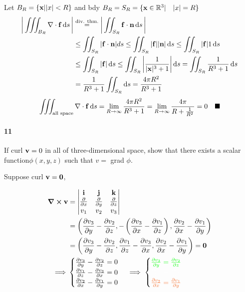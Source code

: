 \documentclass{article}
\newcommand\R{\mathbb{R}}
\begin{document}
Let $B_R = \{\vb{x}| |x| < R\}$ and bdy $B_R = S_R =\{\vb{x}\in \R^3
|\quad |x|=R\} $
\begin{align*}
  \bigg|\iiint_{B_R} \nabla\cdot \bold{f} \dd{s}\bigg|
  &\overset{\text{div. thm.}}{=}
    \bigg|\iint_{S_R} \bold{f}
    \cdot \vb{n} \dd{s}
    \bigg| \\
  &\leq \iint_{S_R} |\bold{f}
    \cdot \vb{n}|
  ds \leq \iint_{S_R} |\bold{f}|
    |\vb{n}| \dd{s} \leq \iint_{S_R} |\bold{f}|
    1 \dd{s}\\
  &\leq \iint_{S_R} |\bold{f}| \dd{s} \leq \iint_{S_R} \bigg|\frac{1}{|\bold{x}|^3+1}\bigg| \dd{s}
    = \iint_{S_R} \frac{1}{R^3+1} \dd{s}\\
  &= \frac{1}{R^3+1}\iint_{S_R} \dd{s} =\frac{4\pi R^2}{ R^3 +1 }\\
\end{align*}
\[\iiint_{\text{all space}} \nabla\cdot \bold{f} \dd{s} =
  \lim_{R\rightarrow \infty} \frac{4\pi R^2}{ R^3 +1 } =
  \lim_{R\rightarrow \infty} \frac{4\pi}{ R +\frac{1}{R^2}} = 0\quad \blacksquare\]
\paragraph{11} If curl $\bold{v} = 0$ in all of three-dimensional space, show that there exists a
scalar function$ \phi(x, y, z)$ such that $v =$ grad $\phi$.

Suppose curl $\vb{v} = \vb{0}$,

\begin{align*}
  \curl{\vb{v}}
  &= \begin{vmatrix} \vb{i} &\vb{j} &\vb{k}\\
    \pdv{}{x} &\pdv{}{y} &\pdv{}{z}\\
    v_1 &v_2 &v_3\end{vmatrix}\\
  &= \left(\pdv{v_3}{y} -\pdv{v_2}{z}, -\left( \pdv{v_3}{x}-
    \pdv{v_1}{z} \right), \pdv{v_2}{x} -\pdv{v_1}{y} \right)\\
  &= \left(\pdv{v_3}{y} -\pdv{v_2}{z},
    \pdv{v_1}{z} -\pdv{v_3}{x}, \pdv{v_2}{x} -\pdv{v_1}{y} \right)=
    \vb{0}\\
 \implies& \begin{cases} \pdv{v_3}{y} -\pdv{v_2}{z} = 0\\ \pdv{v_1}{z}
   -\pdv{v_3}{x} = 0 \\ \pdv{v_2}{x} -\pdv{v_1}{y} = 0\end{cases}
  \implies \begin{cases}\color{green} \pdv{v_3}{y} = \pdv{v_2}{z} \\ \color{White}\pdv{v_1}{z}
   = \pdv{v_3}{x} \\\color{Orange} \pdv{v_2}{x} = \pdv{v_1}{y} \end{cases}
\end{align*}
\end{document}
